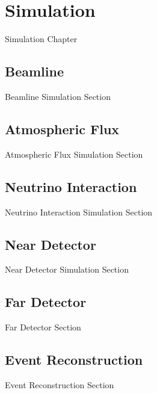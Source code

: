 \chapter{Simulation}
\label{chap:Simulation}
Simulation Chapter

\section{Beamline}
\label{sec:Simulation_Beamline}
Beamline Simulation Section

\section{Atmospheric Flux}
\label{sec:Simulation_AtmosphericFlux}
Atmospheric Flux Simulation Section

\section{Neutrino Interaction}
\label{sec:Simulation_NeutrinoInteraction}
Neutrino Interaction Simulation Section

\section{Near Detector}
\label{sec:Simulation_NearDetector}
Near Detector Simulation Section

\section{Far Detector}
\label{sec:Simulation_FarDetector}
Far Detector Section

\section{Event Reconstruction}
\label{sec:Simulation_EventReconstruction}
Event Reconstruction Section


